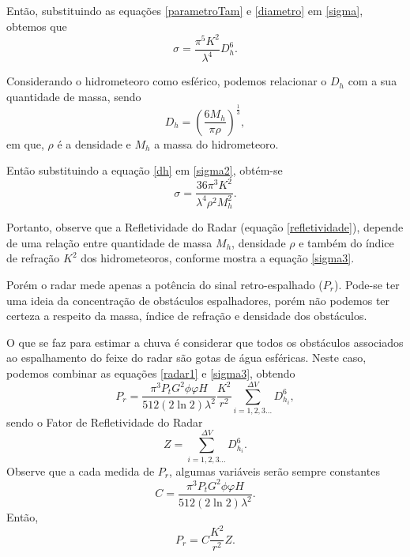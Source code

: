 Então, substituindo as equações \ref{parametroTam} e \ref{diametro} em \ref{sigma}, obtemos que
\begin{equation}
\sigma = \dfrac{\pi^5 K^2  }{ \lambda^4 } D_h^6.
\label{sigma2}
\end{equation}

Considerando o hidrometeoro como esférico, podemos relacionar o $D_h$ com a sua quantidade de massa, sendo  
\begin{equation}
D_h = \left( \dfrac{6 M_h}{\pi \rho} \right)^{\frac{1}{3}},
\label{dh}
\end{equation}
em que, $\rho$ é a densidade e $M_h$ a massa do hidrometeoro.

Então substituindo a equação \ref{dh} em \ref{sigma2}, obtém-se
\begin{equation}
\sigma = \dfrac{36 \pi^3 K^2  }{ \lambda^4 \rho^2 M_h^2} .
\label{sigma3}
\end{equation}

Portanto, observe que a Refletividade do Radar (equação  \ref{refletividade}), depende  de uma relação entre quantidade de massa $M_h$, densidade $\rho$ e também do índice de refração $K^2$ dos hidrometeoros, conforme mostra a equação \ref{sigma3}.

Porém o radar mede apenas a potência do sinal retro-espalhado ($P_r$). Pode-se ter uma ideia da concentração de obstáculos espalhadores, porém não podemos ter certeza a respeito da massa, índice de refração e densidade dos obstáculos. 

O que se faz para estimar a chuva é considerar que todos os obstáculos associados ao espalhamento do feixe do radar são gotas de água esféricas. Neste caso, podemos combinar as equações \ref{radar1} e \ref{sigma3}, obtendo
\begin{equation}
P_r = \dfrac{\pi^3 P_t G^2  \phi \varphi H }{ 512 (2\ln2) \lambda^2 } \dfrac{ K^2  }{ r^2 }  \sum_{i=1, 2, 3 ... }^{\Delta V}  D_{h_i}^6, 
\end{equation} 
sendo o Fator de Refletividade do Radar
\begin{equation}
Z =  \sum_{i=1, 2, 3 ... }^{\Delta V}  D_{h_i}^6.
\label{fz}
\end{equation}
Observe que a cada medida de $P_r$, algumas variáveis serão sempre constantes 
\begin{equation}
C = \dfrac{\pi^3 P_t G^2  \phi \varphi H }{ 512 (2\ln2) \lambda^2 } .
\end{equation}
Então,
\begin{equation}
P_r = C \dfrac{K^2}{r^2}  Z.
\end{equation}

